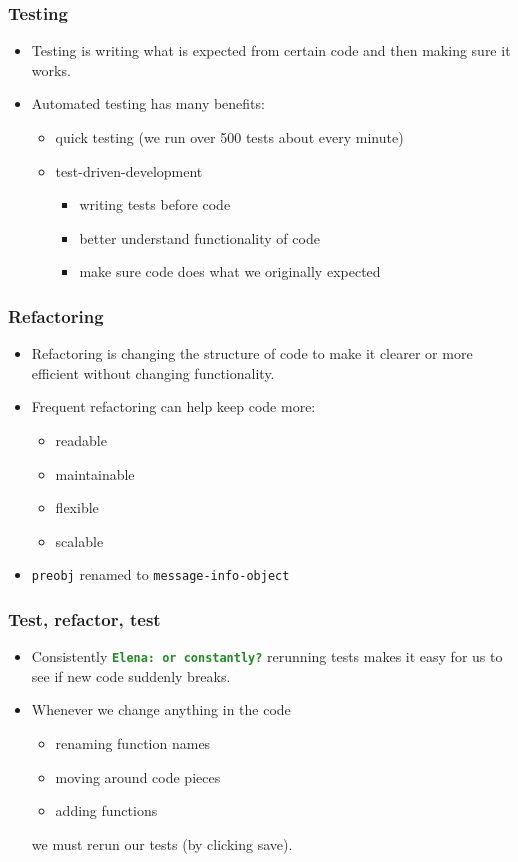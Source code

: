 \documentclass{beamer}
\newcommand{\comment}[1]{{\bf \tt  {#1}}}
\newcommand{\emcomment}[1]{\textcolor{ForestGreen}{\comment{Elena: {#1}}}}
\begin{document}
\begin{frame}[fragile]
\frametitle{Testing}

\begin{itemize}
\item Testing is writing what is expected from certain code and then making sure it works.
\item Automated testing has many benefits:
\begin{itemize}
\item quick testing (we run over 500 tests about every minute)
\item test-driven-development
\begin{itemize}
\item writing tests before code
\item better understand functionality of code
\item make sure code does what we originally expected
\end{itemize}
\end{itemize}
\end{itemize}	
\end{frame}

\begin{frame}[fragile]
\frametitle{Refactoring}
\begin{itemize}
\item Refactoring is changing the structure of code to make it clearer or more efficient  without changing functionality.
\item Frequent refactoring can help keep code more: 
\begin{itemize}
\item readable
\item maintainable
\item flexible
\item scalable
\end{itemize}
\item {\tt preobj} renamed to {\tt message-info-object}
\end{itemize}	
\end{frame}

\begin{frame}[fragile]
\frametitle{Test, refactor, test}
\begin{itemize}
\item Consistently \emcomment{or constantly?} rerunning tests makes it easy for us to see if new code suddenly breaks.
\item Whenever we change anything in the code
\begin{itemize}
\item renaming function names
\item moving around code pieces
\item adding functions
\end{itemize}
we must rerun our tests (by clicking save).
\end{itemize}		
\end{frame}
\end{document}
